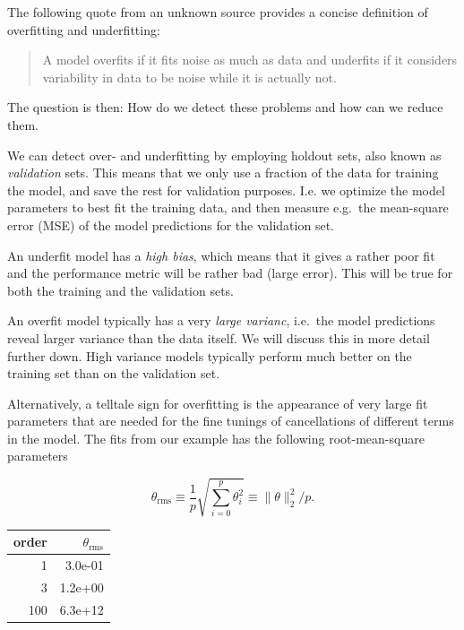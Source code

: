 \documentclass[%
oneside,                 %
final,                   %
10pt]{article}
\begin{document}
The following quote from an unknown source provides a concise definition of overfitting and underfitting:

\begin{quote}
A model overfits if it fits noise as much as data and underfits if it considers variability in data to be noise while it is actually not.
\end{quote}


The question is then: How do we detect these problems and how can we reduce them.

We can detect over- and underfitting by employing holdout sets, also known as \emph{validation} sets. This means that we only use a fraction of the data for training the model, and save the rest for validation purposes. I.e. we optimize the model parameters to best fit the training data, and then measure e.g.~the mean-square error (MSE) of the model predictions for the validation set. 

An underfit model has a \emph{high bias}, which means that it gives a rather poor fit and the performance metric will be rather bad (large error). This will be true for both the training and the validation sets.

An overfit model typically has a very \emph{large varianc}, i.e.~the model predictions reveal larger variance than the data itself. We will discuss this in more detail further down. High variance models typically perform much better on the training set than on the validation set. 

Alternatively, a telltale sign for overfitting is the appearance of very large fit parameters that are needed for the fine tunings of cancellations of different terms in the model. The fits from our example has the following root-mean-square parameters

\[
\theta_\mathrm{rms} \equiv \frac{1}{p} \sqrt{ \sum_{i=0}^p \theta_i^2 } \equiv \| \theta \|_2^2 / p.
\]



\begin{tabular}{rr}
\hline
\multicolumn{1}{r}{ order } & \multicolumn{1}{r}{ $\theta_\mathrm{rms}$ } \\
\hline
1     & 3.0e-01               \\
3     & 1.2e+00               \\
100   & 6.3e+12               \\
\hline
\end{tabular}


\noindent
\end{document}
